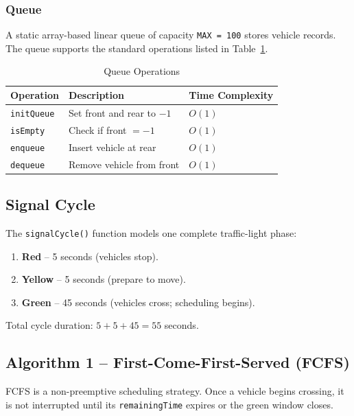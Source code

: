 \documentclass[12pt,a4paper]{article}
\begin{document}
\subsubsection{Queue}
A static array-based linear queue of capacity \texttt{MAX = 100} stores vehicle records. The queue supports the standard operations listed in Table~\ref{tab:queueops}.

\begin{table}[H]
\centering
\caption{Queue Operations}
\label{tab:queueops}
\begin{tabular}{lll}
\toprule
\textbf{Operation} & \textbf{Description} & \textbf{Time Complexity} \\
\midrule
\texttt{initQueue} & Set front and rear to $-1$ & $O(1)$ \\
\texttt{isEmpty}   & Check if front $= -1$       & $O(1)$ \\
\texttt{enqueue}   & Insert vehicle at rear       & $O(1)$ \\
\texttt{dequeue}   & Remove vehicle from front    & $O(1)$ \\
\bottomrule
\end{tabular}
\end{table}

\subsection{Signal Cycle}

The \texttt{signalCycle()} function models one complete traffic-light phase:

\begin{enumerate}
    \item \textbf{Red} -- 5 seconds (vehicles stop).
    \item \textbf{Yellow} -- 5 seconds (prepare to move).
    \item \textbf{Green} -- 45 seconds (vehicles cross; scheduling begins).
\end{enumerate}

Total cycle duration: $5 + 5 + 45 = 55$ seconds.

\subsection{Algorithm 1 -- First-Come-First-Served (FCFS)}

FCFS is a non-preemptive scheduling strategy. Once a vehicle begins crossing, it is not interrupted until its \texttt{remainingTime} expires or the green window closes.
\end{document}
